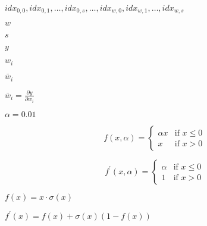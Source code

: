 \documentclass{article}
\begin{document}
$idx_{0,0}, idx_{0,1},\dots,idx_{0,s}, \dots, idx_{w,0},idx_{w,1},\dots,idx_{w,s}$
\pagebreak

$w$
\pagebreak

$s$
\pagebreak

$y$
\pagebreak

$w_i$
\pagebreak

$\bar{w}_i$
\pagebreak

$\bar{w}_i = \frac{\partial y}{\partial w_i}$
\pagebreak

$ \alpha = 0.01 $
\pagebreak

\[ f(x, \alpha) = \begin{cases} \alpha x & \text{if } x \leq 0 \\ x & \text{if } x > 0 \end{cases} \]
\pagebreak

\[ f^\prime(x, \alpha) = \begin{cases} \alpha & \text{if } x \leq 0 \\ 1 & \text{if } x > 0 \end{cases} \]
\pagebreak

$ f(x) = x \cdot \sigma(x) $
\pagebreak

$ f^\prime(x) = f(x) + \sigma(x)(1 - f(x)) $
\pagebreak
\end{document}
